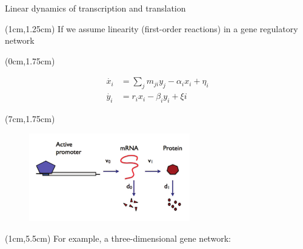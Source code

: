\documentclass[aspectratio=1610]{beamer}					%
\begin{document}
\begin{frame}{Linear dynamics of transcription and translation}

\begin{textblock*}{15cm}(1cm,1.25cm)
If we assume linearity (first-order reactions) in a gene regulatory network
\end{textblock*}

\begin{textblock*}{7cm}(0cm,1.75cm)

\begin{figure}
\begin{align*}
\dot{x_{i}} &= \sum_{j}m_{ji}y_{j} - \alpha_{i}x_{i} + \eta_{i}\\
\dot{y_{i}} &= r_{i}x_{i} - \beta_{i}y_{i} + \xi{i}
\end{align*}
\end{figure}
\end{textblock*}

\begin{textblock*}{7cm}(7cm,1.75cm)
\begin{figure}
\includegraphics[width=7cm]{linear.png}
\end{figure}
\end{textblock*}

\begin{textblock*}{15cm}(1cm,5.5cm)
For example, a three-dimensional gene network:


\end{textblock*}
\end{frame}
\end{document}
